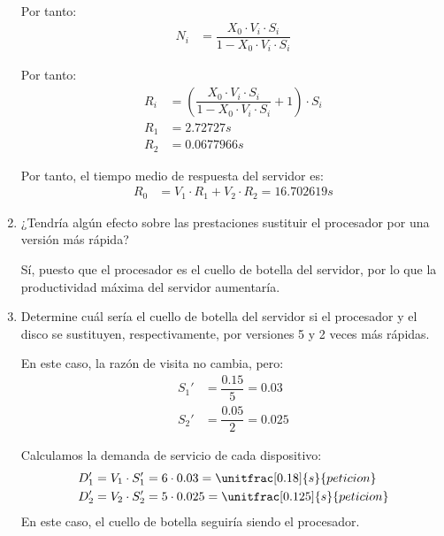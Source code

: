 \begin{ejercicio}
\begin{enumerate}
        Por tanto:
        \begin{align*}
            N_i &= \dfrac{X_0 \cdot V_i \cdot S_i}{1 - X_0 \cdot V_i \cdot S_i}
        \end{align*}

        Por tanto:
        \begin{align*}
            R_i &= \left(\dfrac{X_0 \cdot V_i \cdot S_i}{1 - X_0 \cdot V_i \cdot S_i} + 1\right) \cdot S_i\\
            R_1 &= 2.72727\unit{s}\\
            R_2 &= 0.0677966\unit{s}
        \end{align*}

        Por tanto, el tiempo medio de respuesta del servidor es:
        \begin{align*}
            R_0 &= V_1 \cdot R_1 + V_2 \cdot R_2 = 16.702619\unit{s}
        \end{align*}
        \item ¿Tendría algún efecto sobre las prestaciones sustituir el procesador por una versión más rápida?
        
        Sí, puesto que el procesador es el cuello de botella del servidor, por lo que la productividad máxima del servidor aumentaría.
        \item Determine cuál sería el cuello de botella del servidor si el procesador y el disco se sustituyen, respectivamente, por versiones 5 y 2 veces más rápidas.
        
        En este caso, la razón de visita no cambia, pero:
        \begin{align*}
            S_1' &= \dfrac{0.15}{5} = 0.03 \\
            S_2' &= \dfrac{0.05}{2} = 0.025
        \end{align*}

        Calculamos la demanda de servicio de cada dispositivo:
        \begin{align*}
            D_1' &= V_1 \cdot S_1' = 6 \cdot 0.03 = \unitfrac[0.18]{s}{peticion} \\
            D_2' &= V_2 \cdot S_2' = 5 \cdot 0.025 = \unitfrac[0.125]{s}{peticion}
        \end{align*}
        En este caso, el cuello de botella seguiría siendo el procesador.
    \end{enumerate}
\end{ejercicio}

